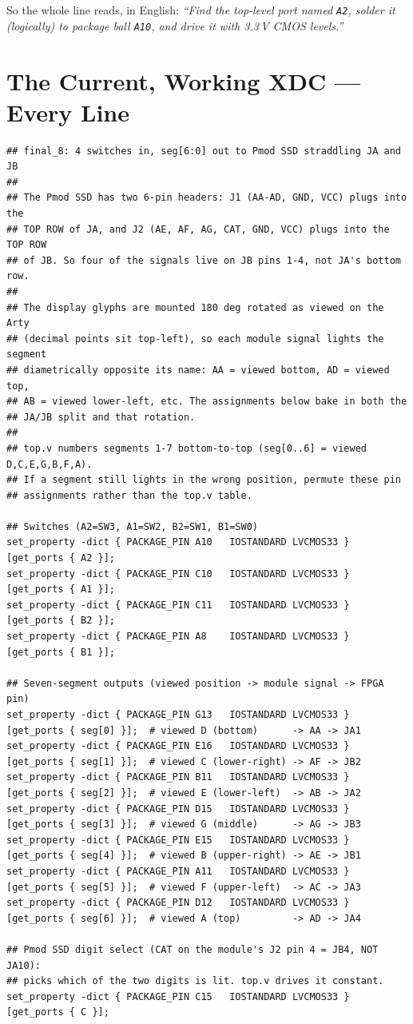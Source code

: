 \documentclass[11pt]{article}
\begin{document}
So the whole line reads, in English: \emph{``Find the top-level port
named \texttt{A2}, solder it (logically) to package ball \texttt{A10}, and
drive it with 3.3\,V CMOS levels.''}

\section{The Current, Working XDC --- Every Line}

\begin{lstlisting}
## final_8: 4 switches in, seg[6:0] out to Pmod SSD straddling JA and JB
##
## The Pmod SSD has two 6-pin headers: J1 (AA-AD, GND, VCC) plugs into the
## TOP ROW of JA, and J2 (AE, AF, AG, CAT, GND, VCC) plugs into the TOP ROW
## of JB. So four of the signals live on JB pins 1-4, not JA's bottom row.
##
## The display glyphs are mounted 180 deg rotated as viewed on the Arty
## (decimal points sit top-left), so each module signal lights the segment
## diametrically opposite its name: AA = viewed bottom, AD = viewed top,
## AB = viewed lower-left, etc. The assignments below bake in both the
## JA/JB split and that rotation.
##
## top.v numbers segments 1-7 bottom-to-top (seg[0..6] = viewed D,C,E,G,B,F,A).
## If a segment still lights in the wrong position, permute these pin
## assignments rather than the top.v table.

## Switches (A2=SW3, A1=SW2, B2=SW1, B1=SW0)
set_property -dict { PACKAGE_PIN A10   IOSTANDARD LVCMOS33 } [get_ports { A2 }];
set_property -dict { PACKAGE_PIN C10   IOSTANDARD LVCMOS33 } [get_ports { A1 }];
set_property -dict { PACKAGE_PIN C11   IOSTANDARD LVCMOS33 } [get_ports { B2 }];
set_property -dict { PACKAGE_PIN A8    IOSTANDARD LVCMOS33 } [get_ports { B1 }];

## Seven-segment outputs (viewed position -> module signal -> FPGA pin)
set_property -dict { PACKAGE_PIN G13   IOSTANDARD LVCMOS33 } [get_ports { seg[0] }];  # viewed D (bottom)      -> AA -> JA1
set_property -dict { PACKAGE_PIN E16   IOSTANDARD LVCMOS33 } [get_ports { seg[1] }];  # viewed C (lower-right) -> AF -> JB2
set_property -dict { PACKAGE_PIN B11   IOSTANDARD LVCMOS33 } [get_ports { seg[2] }];  # viewed E (lower-left)  -> AB -> JA2
set_property -dict { PACKAGE_PIN D15   IOSTANDARD LVCMOS33 } [get_ports { seg[3] }];  # viewed G (middle)      -> AG -> JB3
set_property -dict { PACKAGE_PIN E15   IOSTANDARD LVCMOS33 } [get_ports { seg[4] }];  # viewed B (upper-right) -> AE -> JB1
set_property -dict { PACKAGE_PIN A11   IOSTANDARD LVCMOS33 } [get_ports { seg[5] }];  # viewed F (upper-left)  -> AC -> JA3
set_property -dict { PACKAGE_PIN D12   IOSTANDARD LVCMOS33 } [get_ports { seg[6] }];  # viewed A (top)         -> AD -> JA4

## Pmod SSD digit select (CAT on the module's J2 pin 4 = JB4, NOT JA10):
## picks which of the two digits is lit. top.v drives it constant.
set_property -dict { PACKAGE_PIN C15   IOSTANDARD LVCMOS33 } [get_ports { C }];
\end{lstlisting}
\end{document}
